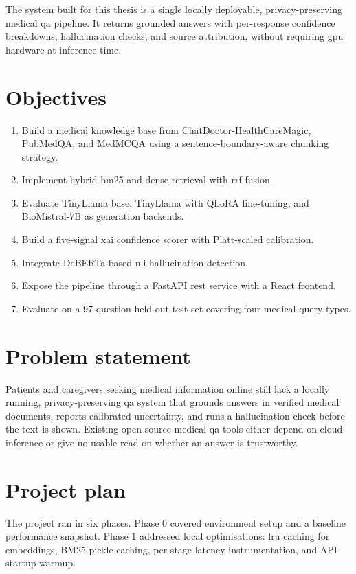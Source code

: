 The system built for this thesis is a single locally deployable, privacy-preserving medical \ac{qa} pipeline. It returns grounded answers with per-response confidence breakdowns, hallucination checks, and source attribution, without requiring \ac{gpu} hardware at inference time.

\section{Objectives}

\begin{enumerate}
    \item Build a medical knowledge base from ChatDoctor-HealthCareMagic, PubMedQA, and \allowbreak{}MedMCQA using a sentence-boundary-aware chunking strategy.
    \item Implement hybrid \ac{bm25} and dense retrieval with \ac{rrf} fusion.
    \item Evaluate TinyLlama base, TinyLlama with QLoRA fine-tuning, and BioMistral-7B as generation backends.
    \item Build a five-signal \ac{xai} confidence scorer with Platt-scaled calibration.
    \item Integrate DeBERTa-based \ac{nli} hallucination detection.
    \item Expose the pipeline through a FastAPI \ac{rest} service with a React frontend.
    \item Evaluate on a 97-question held-out test set covering four medical query types.
\end{enumerate}

\section{Problem statement}

Patients and caregivers seeking medical information online still lack a locally running, privacy-preserving \ac{qa} system that grounds answers in verified medical documents, reports calibrated uncertainty, and runs a hallucination check before the text is shown. Existing open-source medical \ac{qa} tools either depend on cloud inference or give no usable read on whether an answer is trustworthy.

\section{Project plan}

The project ran in six phases. Phase 0 covered environment setup and a baseline performance snapshot. Phase 1 addressed local optimisations: \ac{lru} caching for embeddings, BM25 pickle caching, per-stage latency instrumentation, and API startup warmup.


